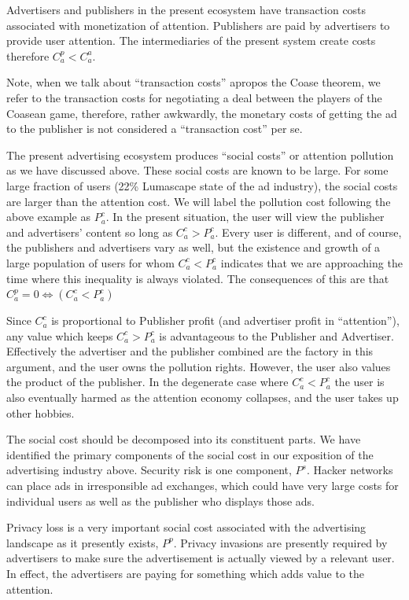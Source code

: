 \documentclass[11pt]{article}
\begin{document}
Advertisers and publishers in the present ecosystem have transaction
costs associated with monetization of attention. Publishers are paid
by advertisers to provide user attention. The intermediaries of the
present system create costs therefore $C^{p}_a <  C^{a}_a$. 

Note, when we talk about ``transaction costs'' apropos the Coase
theorem, we refer to the transaction costs for negotiating a deal
between the players of the Coasean game, therefore, rather awkwardly,
the monetary costs of getting the ad to the publisher is not
considered a ``transaction cost'' per se.

The present advertising ecosystem produces ``social costs'' or attention
pollution as we have discussed above. These social costs are known to
be large. For some large fraction of users (22\% Lumascape state of the
ad industry), the social costs are larger than the attention cost. We
will label the pollution cost following the above example as
$P^{c}_a$. In the present situation, the user will view the
publisher and advertisers’ content so long as $C^{c}_a > P^{c}_a $. 
Every user is different, and of course, the publishers and advertisers
vary as well, but the existence and growth
of a large population of users for whom  $C^{c}_a < P^{c}_a $ indicates that we are
approaching the time where this inequality is always violated. The consequences of this are 
that $ C^{p}_a=0 \iff{(C^{c}_a < P^{c}_a)} $

Since $ C^{c}_a $ is proportional to Publisher profit (and advertiser profit in ``attention''), any value which keeps $C^{c}_a > P^{c}_a $ is advantageous to the Publisher and Advertiser. Effectively the 
advertiser and the publisher combined are the factory
in this argument, and the user owns the pollution rights. However, the
user also values the product of the publisher. In the degenerate case
where $C^{c}_a < P^{c}_a $ the user is also eventually harmed as the
attention economy collapses, and the user takes up other hobbies.


The social cost should be decomposed into its constituent parts. We
have identified the primary components of the social cost in our
exposition of the advertising industry above. Security risk is one
component, $P^{s}$. Hacker networks can place ads in irresponsible ad
exchanges, which could have very large costs for individual users as
well as the publisher who displays those ads. 

Privacy loss is a very important social cost associated with
the advertising landscape as it presently exists, $P^{p}$. Privacy invasions
are presently required by advertisers to make sure the advertisement
is actually viewed by a relevant user. In effect, the advertisers are
paying for something which adds value to the attention. 
\end{document}
